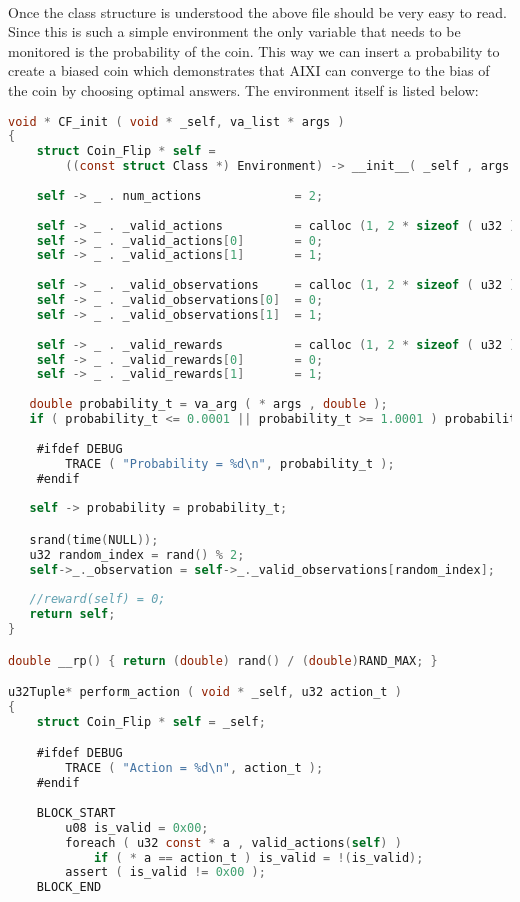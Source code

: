 \documentclass[fancychapters]{report}   	%
\begin{document}
\paragraph{} Once the class structure is understood the above file should be very easy to read.  Since this is such a simple environment the only variable that needs to be monitored is the probability of the coin.  This way we can insert a probability to create a biased coin which demonstrates that AIXI can converge to the bias of the coin by choosing optimal answers. The environment itself is listed below:
\begin{lstlisting}[language=C,caption={coin_flip.c}]
void * CF_init ( void * _self, va_list * args ) 
{
    struct Coin_Flip * self =
        ((const struct Class *) Environment) -> __init__( _self , args );
    
    self -> _ . num_actions             = 2;
    
    self -> _ . _valid_actions          = calloc (1, 2 * sizeof ( u32 ) );
    self -> _ . _valid_actions[0]       = 0;
    self -> _ . _valid_actions[1]       = 1;
       
    self -> _ . _valid_observations     = calloc (1, 2 * sizeof ( u32 ) );
    self -> _ . _valid_observations[0]  = 0;
    self -> _ . _valid_observations[1]  = 1;
   
    self -> _ . _valid_rewards          = calloc (1, 2 * sizeof ( u32 ) );
    self -> _ . _valid_rewards[0]       = 0;
    self -> _ . _valid_rewards[1]       = 1;
   
   double probability_t = va_arg ( * args , double );
   if ( probability_t <= 0.0001 || probability_t >= 1.0001 ) probability_t = 0.7;
    
    #ifdef DEBUG
        TRACE ( "Probability = %d\n", probability_t );
    #endif
    
   self -> probability = probability_t;

   srand(time(NULL));
   u32 random_index = rand() % 2;
   self->_._observation = self->_._valid_observations[random_index];
    
   //reward(self) = 0;
   return self;
}

double __rp() { return (double) rand() / (double)RAND_MAX; }

u32Tuple* perform_action ( void * _self, u32 action_t )
{
    struct Coin_Flip * self = _self;

    #ifdef DEBUG
        TRACE ( "Action = %d\n", action_t );
    #endif
    
    BLOCK_START
        u08 is_valid = 0x00; 
        foreach ( u32 const * a , valid_actions(self) )
            if ( * a == action_t ) is_valid = !(is_valid);
        assert ( is_valid != 0x00 );
    BLOCK_END


\end{lstlisting}
\end{document}
